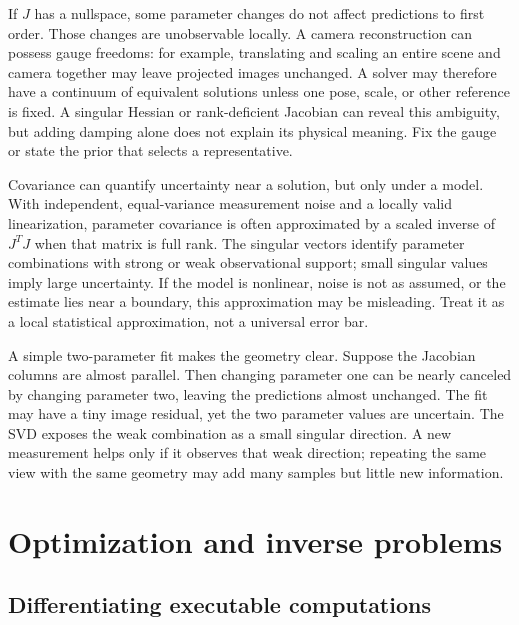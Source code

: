 If \(J\) has a nullspace, some parameter changes do not affect predictions to first order. Those changes are unobservable locally. A camera reconstruction can possess gauge freedoms: for example, translating and scaling an entire scene and camera together may leave projected images unchanged. A solver may therefore have a continuum of equivalent solutions unless one pose, scale, or other reference is fixed. A singular Hessian or rank-deficient Jacobian can reveal this ambiguity, but adding damping alone does not explain its physical meaning. Fix the gauge or state the prior that selects a representative.

Covariance can quantify uncertainty near a solution, but only under a model. With independent, equal-variance measurement noise and a locally valid linearization, parameter covariance is often approximated by a scaled inverse of \(J^TJ\) when that matrix is full rank. The singular vectors identify parameter combinations with strong or weak observational support; small singular values imply large uncertainty. If the model is nonlinear, noise is not as assumed, or the estimate lies near a boundary, this approximation may be misleading. Treat it as a local statistical approximation, not a universal error bar.

A simple two-parameter fit makes the geometry clear. Suppose the Jacobian columns are almost parallel. Then changing parameter one can be nearly canceled by changing parameter two, leaving the predictions almost unchanged. The fit may have a tiny image residual, yet the two parameter values are uncertain. The SVD exposes the weak combination as a small singular direction. A new measurement helps only if it observes that weak direction; repeating the same view with the same geometry may add many samples but little new information.

\section{Optimization and inverse problems}\label{02-foundations-ii-ch026-optimization-and-inverse-problems}

\hypertarget{02-foundations-ii-ch026-optimization-and-inverse-problems}{}

\subsection{Differentiating executable computations}\label{02-foundations-ii-ch026-differentiating-executable-computations}

